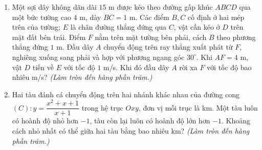 \documentclass[12pt,a4paper]{article}
\begin{document}
\begin{enumerate}
\item \begin{minipage}[t]{0.55\linewidth}
Một sợi dây không dãn dài $15$ m được kéo theo đường gấp khúc $ABCD$ qua một bức tường cao $4$ m, dày $BC=1$ m. Các điểm $B,C$ cố định ở hai mép trên của tường; $E$ là chân đường thẳng đứng qua $C$, vật cần kéo ở $D$ trên mặt đất bên trái. Điểm $F$ nằm trên mặt tường bên phải, cách $B$ theo phương thẳng đứng $1$ m. Đầu dây $A$ chuyển động trên ray thẳng xuất phát từ $F$, nghiêng xuống sang phải và hợp với phương ngang góc $30^\circ$. Khi $AF=4$ m, vật $D$ tiến về $E$ với tốc độ $1$ m/s. Khi đó đầu dây $A$ rời xa $F$ với tốc độ bao nhiêu m/s? \textit{(Làm tròn đến hàng phần trăm.)}
\end{minipage}\hfill
\begin{minipage}[t]{0.42\linewidth}\vspace{-0.4\baselineskip}\centering
{}
\end{minipage}

\item Hai tàu đánh cá chuyển động trên hai nhánh khác nhau của đường cong $(C):y=\dfrac{x^2+x+1}{x+1}$ trong hệ trục $Oxy$, đơn vị mỗi trục là km. Một tàu luôn có hoành độ nhỏ hơn $-1$, tàu còn lại luôn có hoành độ lớn hơn $-1$. Khoảng cách nhỏ nhất có thể giữa hai tàu bằng bao nhiêu km? \textit{(Làm tròn đến hàng phần trăm.)}


\end{enumerate}
\end{document}
